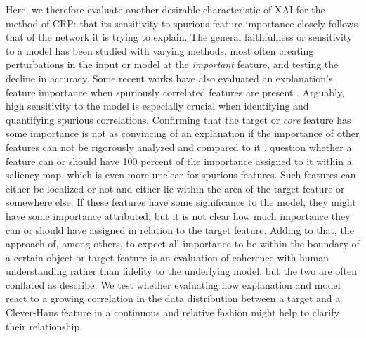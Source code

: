 Here, we therefore evaluate another desirable characteristic of XAI for the method of CRP: that its sensitivity to spurious feature importance closely follows that of the network it is trying to explain. The general faithfulness or sensitivity to a model has been studied with varying methods, most often creating perturbations in the input or model at the \textit{important} feature, and testing the decline in accuracy. Some recent works have also evaluated an explanation's feature importance when spuriously correlated features are present \citep{Yang2019,Kim2018,Parafita2019,Reimers2020,Singla2022}. Arguably, high sensitivity to the model is especially crucial when identifying and quantifying spurious correlations. Confirming that the target or \textit{core} feature has some importance is not as convincing of an explanation if the importance of other features can not be rigorously analyzed and compared to it \citep{Singla2022}. \cite{Arras2022} question whether a feature can or should have 100 percent of the importance assigned to it within a saliency map, which is even more unclear for spurious features. Such features can either be localized or not and either lie within the area of the target feature or somewhere else. If these features have some significance to the model, they might have some importance attributed, but it is not clear how much importance they can or should have assigned in relation to the target feature. Adding to that, the approach of, among others, \citet{Arras2022} to expect all importance to be within the boundary of a certain object or target feature is an evaluation of coherence with human understanding rather than fidelity to the underlying model, but the two are often conflated as \cite{Nauta2023} describe. 
We test whether evaluating how explanation and model react to a growing correlation in the data distribution between a target and a Clever-Hans feature in a continuous and relative fashion might help to clarify their relationship.

